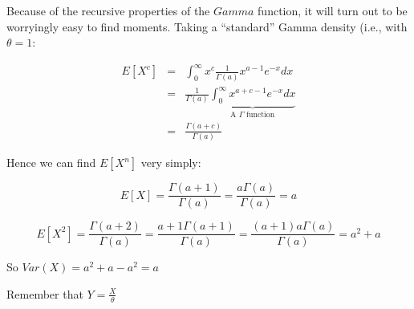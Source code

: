 \documentclass[12pt]{extbook}
\begin{document}




Because of the recursive properties of the $Gamma$ function, it will turn out to be worryingly easy to find moments.   Taking a ``standard'' Gamma density (i.e., with $\theta=1$:

\begin{eqnarray*}
E[X^c] &=&  \int_0^{\infty} x^c \frac{1}{\Gamma (a)} x^{a-1} e^{-x} dx \\
&=& \frac{1}{\Gamma (a)} \underbrace{\int_0^{\infty}  x^{a+c-1} e^{-x} dx}_{\mbox{A }\Gamma \mbox{ function}} \\
&=& \frac{\Gamma(a+c)}{\Gamma(a)}
\end{eqnarray*}

Hence we can find $E[X^n]$ very simply:

\begin{displaymath}
E[X] = \frac{\Gamma (a+1)}{\Gamma(a)} = \frac{a \Gamma(a)}{\Gamma(a)} = a
\end{displaymath}


\begin{displaymath}
E[X^2] = \frac{\Gamma (a+2)}{\Gamma(a)} = \frac{a+1 \Gamma(a+1)}{\Gamma(a)} = \frac{(a+1)a\Gamma(a)}{\Gamma(a)}  = a^2+a
\end{displaymath}

So $Var(X) = a^2+a-a^2 = a$

Remember that $Y = \frac{X}{\theta}$








\end{document}
